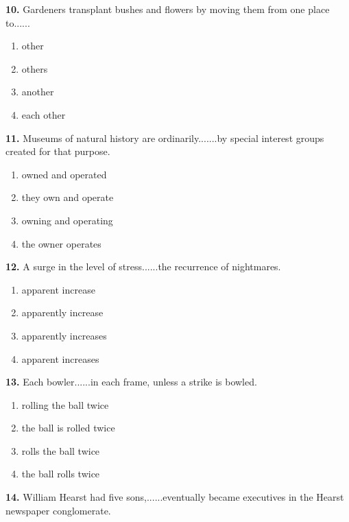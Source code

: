\documentclass[12pt]{article}
\begin{document}
\noindent\textbf{10.} Gardeners transplant bushes and flowers by moving them from one place to......
\begin{enumerate}[label=(\Alph*),leftmargin=*,itemsep=0.2em]
\item other
\item others
\item another
\item each other
\end{enumerate}
\par
\vspace{0.25\baselineskip}
\noindent\textbf{11.} Museums of natural history are ordinarily.......by special interest groups created for that purpose.
\begin{enumerate}[label=(\Alph*),leftmargin=*,itemsep=0.2em]
\item owned and operated
\item they own and operate
\item owning and operating
\item the owner operates
\end{enumerate}
\par
\vspace{0.25\baselineskip}
\noindent\textbf{12.} A surge in the level of stress......the recurrence of nightmares.
\begin{enumerate}[label=(\Alph*),leftmargin=*,itemsep=0.2em]
\item apparent increase
\item apparently increase
\item apparently increases
\item apparent increases
\end{enumerate}
\par
\vspace{0.25\baselineskip}
\noindent\textbf{13.} Each bowler......in each frame, unless a strike is bowled.
\begin{enumerate}[label=(\Alph*),leftmargin=*,itemsep=0.2em]
\item rolling the ball twice
\item the ball is rolled twice
\item rolls the ball twice
\item the ball rolls twice
\end{enumerate}
\par
\vspace{0.25\baselineskip}
\noindent\textbf{14.} William Hearst had five sons,......eventually became executives in the Hearst newspaper conglomerate.
\end{document}
